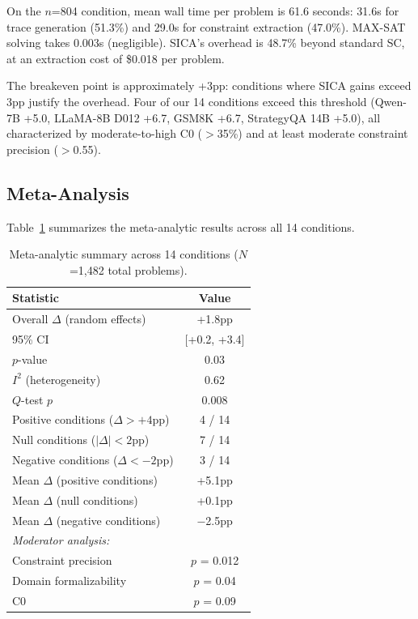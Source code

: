 \documentclass[11pt,a4paper]{article}
\begin{document}
On the $n$=804 condition, mean wall time per problem is 61.6 seconds: 31.6s for trace generation (51.3\%) and 29.0s for constraint extraction (47.0\%). MAX-SAT solving takes 0.003s (negligible). SICA's overhead is 48.7\% beyond standard SC, at an extraction cost of \$0.018 per problem.

The breakeven point is approximately +3pp: conditions where SICA gains exceed 3pp justify the overhead. Four of our 14 conditions exceed this threshold (Qwen-7B +5.0, LLaMA-8B D012 +6.7, GSM8K +6.7, StrategyQA 14B +5.0), all characterized by moderate-to-high C0 ($>$35\%) and at least moderate constraint precision ($>$0.55).

\subsection{Meta-Analysis}
\label{sec:meta}

Table~\ref{tab:meta} summarizes the meta-analytic results across all 14 conditions.

\begin{table}[t]
\centering
\caption{Meta-analytic summary across 14 conditions ($N$=1,482 total problems).}
\label{tab:meta}
\small
\begin{tabular}{lc}
\toprule
\textbf{Statistic} & \textbf{Value} \\
\midrule
Overall $\Delta$ (random effects) & +1.8pp \\
95\% CI & [+0.2, +3.4] \\
$p$-value & 0.03 \\
$I^2$ (heterogeneity) & 0.62 \\
$Q$-test $p$ & 0.008 \\
\midrule
Positive conditions ($\Delta > +4$pp) & 4 / 14 \\
Null conditions ($|\Delta| < 2$pp) & 7 / 14 \\
Negative conditions ($\Delta < -2$pp) & 3 / 14 \\
\midrule
Mean $\Delta$ (positive conditions) & +5.1pp \\
Mean $\Delta$ (null conditions) & +0.1pp \\
Mean $\Delta$ (negative conditions) & $-$2.5pp \\
\midrule
\multicolumn{2}{l}{\textit{Moderator analysis:}} \\
Constraint precision & $p$ = 0.012 \\
Domain formalizability & $p$ = 0.04 \\
C0 & $p$ = 0.09 \\
\bottomrule
\end{tabular}
\end{table}
\end{document}
